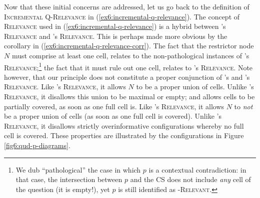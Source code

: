 Now that these initial concerns are addressed, let us go back to the definition of \textsc{Incremental Q-Relevance} in (\ref{ex6:incremental-q-relevance}). The concept of \textsc{Relevance} used in (\ref{ex6:incremental-q-relevance}) is a hybrid between \citeauthor{Lewis1988}'s \textsc{Relevance} and \citeauthor{Roberts2012}'s \textsc{Relevance}. This is perhaps made more obvious by the corollary in (\ref{ex6:incremental-q-relevance-corr}). The fact that the restrictor node $N$ must comprise at least one cell, relates to the non-pathological instances of \citeauthor{Lewis1988}'s \textsc{Relevance};\footnote{We dub ``pathological'' the case in which $p$ is a contextual contradiction: in that case, the intersection between $p$ and the CS does not include \textit{any} cell of the question (it is empty!), yet $p$ is still identified as \textsc{\citeauthor{Lewis1988}-Relevant}.} the fact that it must rule out one cell, relates to \citeauthor{Roberts2012}'s \textsc{Relevance}. Note however, that our principle does not constitute a proper conjunction of \citeauthor{Lewis1988}'s and \citeauthor{Roberts2012}'s \textsc{Relevance}. Like \citeauthor{Lewis1988}'s \textsc{Relevance}, it allows $N$ to be a proper union of cells. Unlike \citeauthor{Lewis1988}'s \textsc{Relevance}, it disallows this union to be maximal or empty; and allows cells to be partially covered, as soon as one full cell is. Like \citeauthor{Roberts2012}'s \textsc{Relevance}, it allows $N$ to \textit{not} be a proper union of cells (as soon as one full cell is covered). Unlike \citeauthor{Roberts2012}'s \textsc{Relevance}, it disallows strictly overinformative configurations whereby no full cell is covered. These properties are illustrated by the configurations in Figure \ref{fig6:qud-p-diagrams}.


